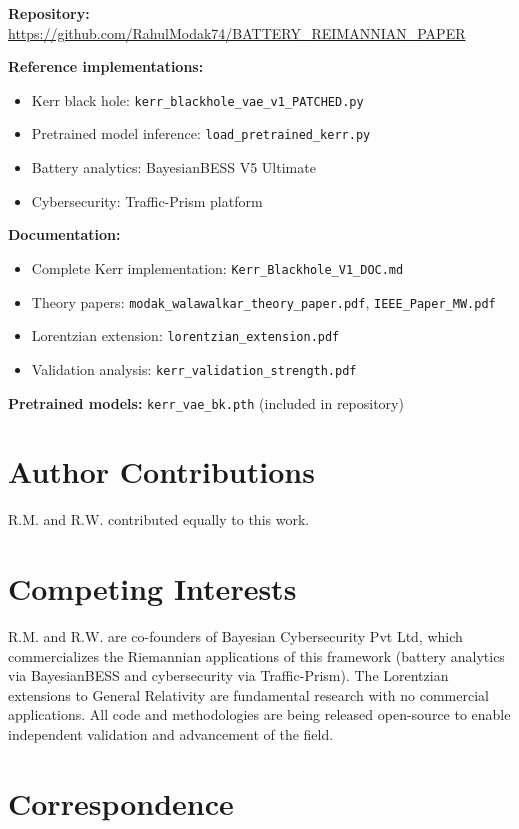 \documentclass[11pt,a4paper]{article}
\begin{document}
\textbf{Repository:} \url{https://github.com/RahulModak74/BATTERY_REIMANNIAN_PAPER}

\textbf{Reference implementations:}
\begin{itemize}
\item Kerr black hole: \texttt{kerr\_blackhole\_vae\_v1\_PATCHED.py}
\item Pretrained model inference: \texttt{load\_pretrained\_kerr.py}
\item Battery analytics: BayesianBESS V5 Ultimate
\item Cybersecurity: Traffic-Prism platform
\end{itemize}

\textbf{Documentation:}
\begin{itemize}
\item Complete Kerr implementation: \texttt{Kerr\_Blackhole\_V1\_DOC.md}
\item Theory papers: \texttt{modak\_walawalkar\_theory\_paper.pdf}, \texttt{IEEE\_Paper\_MW.pdf}
\item Lorentzian extension: \texttt{lorentzian\_extension.pdf}
\item Validation analysis: \texttt{kerr\_validation\_strength.pdf}
\end{itemize}

\textbf{Pretrained models:} \texttt{kerr\_vae\_bk.pth} (included in repository)

\section*{Author Contributions}

R.M. and R.W. contributed equally to this work.

\section*{Competing Interests}

R.M. and R.W. are co-founders of Bayesian Cybersecurity Pvt Ltd, which commercializes the Riemannian applications of this framework (battery analytics via BayesianBESS and cybersecurity via Traffic-Prism). The Lorentzian extensions to General Relativity are fundamental research with no commercial applications. All code and methodologies are being released open-source to enable independent validation and advancement of the field.

\section*{Correspondence}
\end{document}
